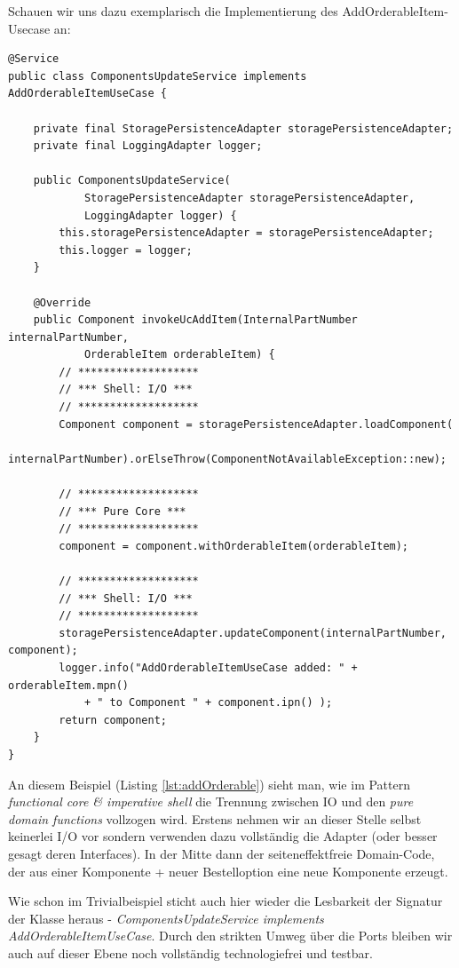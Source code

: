 Schauen wir uns dazu exemplarisch die Implementierung 
des AddOrderableItem-Usecase an:
\begin{listing}[H]
\begin{verbatim}
@Service
public class ComponentsUpdateService implements AddOrderableItemUseCase {

    private final StoragePersistenceAdapter storagePersistenceAdapter;
    private final LoggingAdapter logger;

    public ComponentsUpdateService(
            StoragePersistenceAdapter storagePersistenceAdapter, 
            LoggingAdapter logger) {
        this.storagePersistenceAdapter = storagePersistenceAdapter;
        this.logger = logger;
    }

    @Override
    public Component invokeUcAddItem(InternalPartNumber internalPartNumber,
            OrderableItem orderableItem) {
        // *******************
        // *** Shell: I/O ***
        // *******************
        Component component = storagePersistenceAdapter.loadComponent(
                internalPartNumber).orElseThrow(ComponentNotAvailableException::new);

        // *******************
        // *** Pure Core ***
        // *******************
        component = component.withOrderableItem(orderableItem);

        // *******************
        // *** Shell: I/O ***
        // *******************
        storagePersistenceAdapter.updateComponent(internalPartNumber, component);
        logger.info("AddOrderableItemUseCase added: " + orderableItem.mpn() 
            + " to Component " + component.ipn() );
        return component;
    }
}

\end{verbatim}
\caption{Hinzufügen einer Bestelloption zu einem Bauteil}
\label{lst:addOrderable}
\end{listing}

An diesem Beispiel (Listing \ref{lst:addOrderable}) sieht man, wie im Pattern
\textit{functional core \& imperative shell} die Trennung zwischen I\/O und
den \textit{pure domain functions} vollzogen wird. Erstens nehmen wir
an dieser Stelle selbst keinerlei I/O vor sondern verwenden dazu vollständig
die Adapter (oder besser gesagt deren Interfaces). In der Mitte dann der
seiteneffektfreie Domain-Code, der aus einer Komponente + neuer Bestelloption
eine neue Komponente erzeugt.

Wie schon im Trivialbeispiel sticht auch hier wieder die Lesbarkeit der 
Signatur der Klasse heraus -
\textit{ComponentsUpdateService implements AddOrderableItemUseCase}. 
Durch den strikten Umweg über die Ports bleiben wir auch auf dieser Ebene
noch vollständig technologiefrei und testbar.

